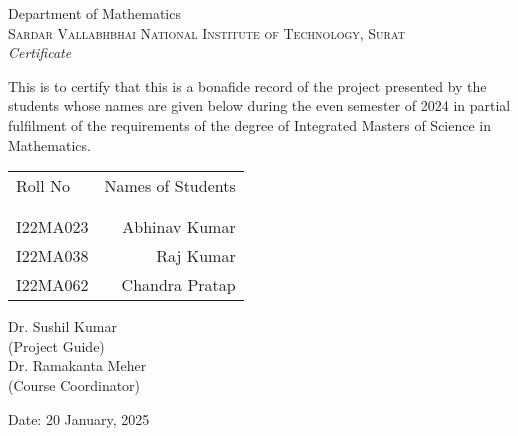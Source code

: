 \newpage
\thispagestyle{empty}

\begin{center}

\huge{Department of Mathematics}\\[0.5cm]
\normalsize
\textsc{Sardar Vallabhbhai National Institute of Technology, Surat}\\[2.0cm]

\emph{\LARGE Certificate}\\[2.5cm]
\end{center}
\normalsize This is to certify that this is a bonafide record of the project presented by the students whose names are given below during the even semester of 2024 in partial fulfilment of the requirements of the degree of Integrated Masters of Science in Mathematics.\\[1.0cm]

\begin{table}[h]
\centering
\begin{tabular}{lr}
Roll No & Names of Students \\ \\ \hline
\\
I22MA023 & Abhinav Kumar \\ 
I22MA038 &  Raj Kumar \\
I22MA062 & Chandra Pratap \\
\end{tabular}
\end{table}

\vfill


\begin{flushright}
Dr. Sushil Kumar\\
(Project Guide)\\[1.5cm]
Dr. Ramakanta Meher\\
(Course Coordinator)\\
\end{flushright}

\begin{flushleft}
Date: 20 January, 2025
\end{flushleft}
